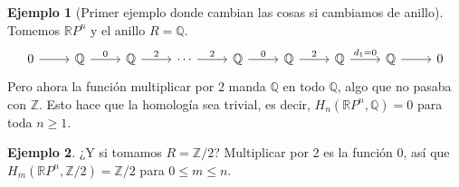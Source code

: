 \documentclass[spanish]{book}
\theoremstyle{definition}
\newtheorem*{ejem}{Ejemplo}
\newcommand{\R}{\mathbb{R}}
\newcommand{\Z}{\mathbb{Z}}
\newcommand{\Q}{\mathbb{Q}}
\begin{document}
	\begin{ejem}[Primer ejemplo donde cambian las cosas si cambiamos de anillo]
		Tomemos $\R P^n$ y el anillo $R=\Q$.
		\[\begin{tikzcd}
			0 \arrow[r] & \mathbb{Q} \arrow[r, "0"] & \mathbb{Q} \arrow[r, "2"] & \cdots \arrow[r, "2"] & \mathbb{Q} \arrow[r, "0"] & \mathbb{Q} \arrow[r, "2"] & \mathbb{Q} \arrow[r, "d_1=0"] & \mathbb{Q} \arrow[r] & 0
		\end{tikzcd}\]
		Pero ahora la función multiplicar por 2 manda $\Q$ en todo $\Q$, algo que no pasaba con $\Z$. Esto hace que la homología sea trivial, es decir, $H_n(\R P^n,\Q)=0$ para toda $n\geq1$.
	\end{ejem}
	\begin{ejem}
		¿Y si tomamos $R=\Z/2$? Multiplicar por 2 es la función 0, así que $H_m(\R P^n,\Z/2)=\Z/2$ para $0\leq m\leq n$.
	\end{ejem}
\end{document}
